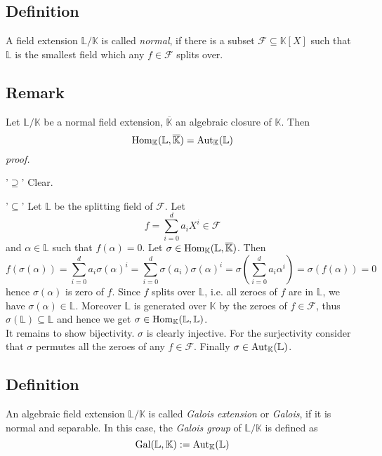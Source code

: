 \documentclass[12pt]{book}
\begin{document}
\begin{spacing}{1.3}
\subsection{Definition} %
A field extension $\mathbb{L}/\mathbb{K}$ is called \textit{normal}, if there is a subset $\mathcal{F} \subseteq \mathbb{K}[X]$ such that $\mathbb{L}$ is the smallest field which any $f \in \mathcal{F}$ splits over.

\subsection{Remark} %
Let $\mathbb{L}/\mathbb{K}$ be a normal field extension, $\overline{\mathbb{K}}$ an algebraic closure of $\mathbb{K}$. Then 
$$\rm{Hom}_{\mathbb{K}}(\mathbb{L},\overline{\mathbb{K}})=\rm{Aut}_{\mathbb{K}}(\mathbb{L})$$
\textit{proof.}
\begin{compactitem}
\item['$\supseteq$'] Clear.
\item['$\subseteq$'] Let $\mathbb{L}$ be the splitting field of $\mathcal{F}$. Let $$f=\sum_{i=0}^d a_i X^{i} \in \mathcal{F}$$ and $\alpha \in  \mathbb{L}$ such that $f(\alpha)=0$. Let $\sigma \in \rm{Hom}_{\mathbb{K}}(\mathbb{L}, \overline{\mathbb{K}})$. Then
$$f\left(\sigma(\alpha)\right)=\sum_{i=0}^d a_i \sigma(\alpha)^{i} = \sum_{i=0}^d \sigma(a_i) \sigma(\alpha)^{i} = \sigma\left(\sum_{i=0}^d a_i \alpha^{i}\right)= \sigma \left(f(\alpha)\right)=0$$hence $\sigma(\alpha)$ is zero of $f$. Since $f$ splits over $\mathbb{L}$, i.e. all zeroes of $f$ are in $\mathbb{L}$, we have $\sigma(\alpha) \in \mathbb{L}$. Moreover $\mathbb{L}$ is generated over $\mathbb{K}$ by the zeroes of $f \in \mathcal{F}$, thus $\sigma(\mathbb{L})\subseteq \mathbb{L}$ and hence we get $\sigma \in \rm{Hom}_{\mathbb{K}}(\mathbb{L},\mathbb{L})$.\\
It remains to show bijectivity. $\sigma$ is clearly injective. For the surjectivity consider that $\sigma$ permutes all the zeroes of any $f \in \mathcal{F}$. Finally $\sigma \in \rm{Aut}_{\mathbb{K}}(\mathbb{L})$.
\end{compactitem}

\subsection{Definition} %
An algebraic field extension $\mathbb{L}/\mathbb{K}$ is called \textit{Galois extension} or \textit{Galois}, if it is normal and separable. In this case, the \textit{Galois group} of $\mathbb{L}/\mathbb{K}$ is defined as
$$\rm{Gal}(\mathbb{L},\mathbb{K}):=\rm{Aut}_{\mathbb{K}}(\mathbb{L})$$


\end{spacing}
\end{document}

